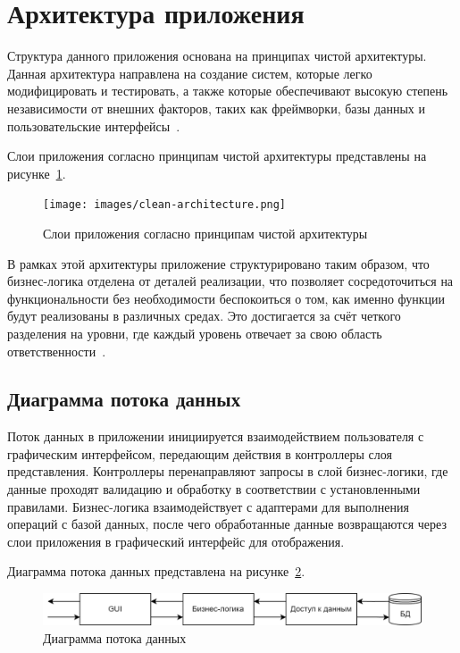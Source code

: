\section{Архитектура приложения}

Структура данного приложения основана на принципах чистой архитектуры. Данная архитектура направлена на создание систем, которые легко модифицировать и тестировать, а также которые обеспечивают высокую степень независимости от внешних факторов, таких как фреймворки, базы данных и пользовательские интерфейсы~\cite{lit10}.

Слои приложения согласно принципам чистой архитектуры представлены на рисунке~\ref{fig:clean-architecture}.

\begin{figure}[h]
	\centering
	\texttt{[image: images/clean-architecture.png]}
	\caption{Слои приложения согласно принципам чистой архитектуры} 
	\label{fig:clean-architecture} 
\end{figure}

В рамках этой архитектуры приложение структурировано таким образом, что бизнес-логика отделена от деталей реализации, что позволяет сосредоточиться на функциональности без необходимости беспокоиться о том, как именно функции будут реализованы в различных средах. Это достигается за счёт четкого разделения на уровни, где каждый уровень отвечает за свою область ответственности~\cite{lit10}.

\subsection{Диаграмма потока данных}

Поток данных в приложении инициируется взаимодействием пользователя с графическим интерфейсом, передающим действия в контроллеры слоя представления. Контроллеры перенаправляют запросы в слой бизнес-логики, где данные проходят валидацию и обработку в соответствии с установленными правилами. Бизнес-логика взаимодействует с адаптерами для выполнения операций с базой данных, после чего обработанные данные возвращаются через слои приложения в графический интерфейс для отображения.

\newpage

Диаграмма потока данных представлена на рисунке~\ref{fig:data-flow}.

\begin{figure}[H]
	\centering
	\includegraphics[width=1\textwidth]{images/data-flow.png}
	\caption{Диаграмма потока данных} 
	\label{fig:data-flow} 
\end{figure}


